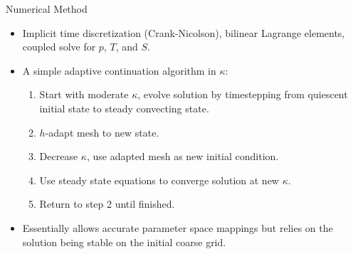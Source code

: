 \documentclass[compress,12pt]{beamer}
\begin{document}
\begin{frame}{Numerical Method}

  \begin{itemize}
    \item Implicit time discretization (Crank-Nicolson), bilinear
      Lagrange elements, coupled solve for $p$, $T$, and $S$.

    \item A simple adaptive continuation algorithm in $\kappa$:
      \begin{enumerate}
	\item Start with moderate $\kappa$, evolve solution by timestepping from
	  quiescent initial state to steady convecting state.
	\item $h$-adapt mesh to new state.
	\item Decrease $\kappa$, use adapted mesh as new initial condition.
	\item Use steady state equations to converge solution at new $\kappa$.
	\item Return to step 2 until finished.
      \end{enumerate}


      
    \item Essentially allows accurate parameter space mappings but relies
      on the solution being stable on the initial coarse grid.
  \end{itemize}

\end{frame}
\end{document}
